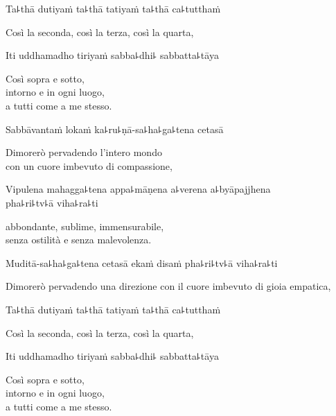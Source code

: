 Ta꜕thā dutiyaṁ ta꜕thā tatiyaṁ ta꜕thā ca꜕tutthaṁ\\

  \begin{english}
Così la seconda, così la terza, così la quarta,
  \end{english}

Iti uddhamadho tiriyaṁ sabba꜕dhi꜕ sabbatta꜕tāya\\

     \begin{english}
Così sopra e sotto,\\
   intorno e in ogni luogo,\\
   a tutti come a me stesso.
  \end{english}

Sabbāvantaṁ lokaṁ ka꜕ru꜕ṇā-sa꜕ha꜕ga꜕tena cetasā\\
  \begin{english} 
Dimorerò pervadendo l'intero mondo\\
 con un cuore imbevuto di compassione,
  \end{english}

Vipulena mahagga꜕tena appa꜕māṇena a꜕verena a꜕byāpajjhena\\
pha꜕ri꜕tv꜕ā viha꜕ra꜕ti
 
\begin{english} 
abbondante, sublime, immensurabile,\\ 
senza ostilità e senza malevolenza.
  \end{english} 

Muditā-sa꜕ha꜕ga꜕tena cetasā ekaṁ disaṁ pha꜕ri꜕tv꜕ā viha꜕ra꜕ti\\

\begin{english} 
Dimorerò pervadendo una direzione con il cuore imbevuto di gioia empatica,
  \end{english}

Ta꜕thā dutiyaṁ ta꜕thā tatiyaṁ ta꜕thā ca꜕tutthaṁ\\
\begin{english} 
Così la seconda, così la terza, così la quarta,
  \end{english} 

Iti uddhamadho tiriyaṁ sabba꜕dhi꜕ sabbatta꜕tāya\\

\begin{english} 
Così sopra e sotto,\\
   intorno e in ogni luogo,\\
   a tutti come a me stesso.
  \end{english}

